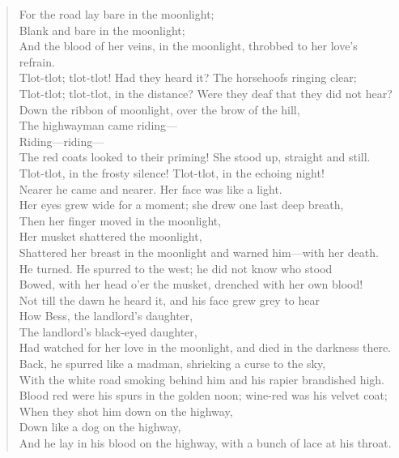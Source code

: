 \begin{verse}
For the road lay bare in the moonlight;\\
Blank and bare in the moonlight;\\
And the blood of her veins, in the moonlight, throbbed to her love's refrain.\\
Tlot-tlot; tlot-tlot! Had they heard it? The horsehoofs ringing clear;\\
Tlot-tlot; tlot-tlot, in the distance? Were they deaf that they did not hear?\\
Down the ribbon of moonlight, over the brow of the hill,\\
The highwayman came riding---\\
Riding---riding---\\
The red coats looked to their priming! She stood up, straight and still.\\
Tlot-tlot, in the frosty silence! Tlot-tlot, in the echoing night!\\
Nearer he came and nearer. Her face was like a light.\\
Her eyes grew wide for a moment; she drew one last deep breath,\\
Then her finger moved in the moonlight,\\
Her musket shattered the moonlight,\\
Shattered her breast in the moonlight and warned him---with her death.\\
He turned. He spurred to the west; he did not know who stood\\
Bowed, with her head o'er the musket, drenched with her own blood!\\
Not till the dawn he heard it, and his face grew grey to hear\\
How Bess, the landlord's daughter,\\
The landlord's black-eyed daughter,\\
Had watched for her love in the moonlight, and died in the darkness there.\\
Back, he spurred like a madman, shrieking a curse to the sky,\\
With the white road smoking behind him and his rapier brandished high.\\
Blood red were his spurs in the golden noon; wine-red was his velvet coat;\\
When they shot him down on the highway,\\
Down like a dog on the highway,\\
And he lay in his blood on the highway, with a bunch of lace at his throat.\\

\end{verse}
